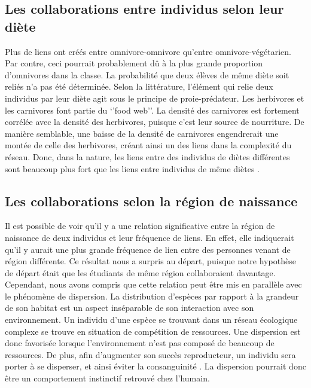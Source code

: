 \documentclass[twoside,twocolumn]{article}
\begin{document}
\subsection{Les collaborations entre individus selon leur diète}
Plus de liens ont créés entre omnivore-omnivore qu’entre omnivore-végétarien. Par contre, ceci pourrait probablement dû à la plus grande proportion d’omnivores dans la classe. La probabilité que deux élèves de même diète soit reliés n’a pas été déterminée. Selon la littérature, l’élément qui relie deux individus par leur diète agit sous le principe de proie-prédateur. Les herbivores et les carnivores font partie du ‘’food web’’. La densité des carnivores est fortement corrélée avec la densité des herbivores, puisque c’est leur source de nourriture. De manière semblable, une baisse de la densité de carnivores engendrerait une montée de celle des herbivores, créant ainsi un des liens dans la complexité du réseau. Donc, dans la nature, les liens entre des individus de diètes différentes sont beaucoup plus fort que les liens entre individus de même diètes \citep{paine1980food}.


\subsection{Les collaborations selon la région de naissance}
Il est possible de voir qu’il y a une relation significative entre la région de naissance de deux individus et leur fréquence de liens. En effet, elle indiquerait qu’il y aurait une plus grande fréquence de lien entre des personnes venant de région différente. Ce résultat nous a surpris au départ, puisque notre hypothèse de départ était que les étudiants de même région collaboraient davantage. Cependant, nous avons compris que cette relation peut être mis en parallèle avec le phénomène de dispersion. La distribution d’espèces par rapport à la grandeur de son habitat est un aspect inséparable de son interaction avec son environnement. Un individu d’une espèce se trouvant dans un réseau écologique complexe se trouve en situation de compétition de ressources. Une dispersion est donc favorisée lorsque l'environnement n’est pas composé de beaucoup de ressources. De plus, afin d’augmenter son succès reproducteur, un individu sera porter à se disperser, et ainsi éviter la consanguinité \citep{levin1974dispersion}.  La dispersion pourrait donc être un comportement instinctif  retrouvé chez l’humain.


\end{document}
